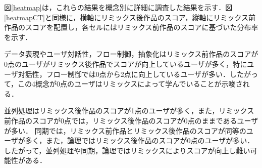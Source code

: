 \documentclass[submit,techrep,noauthor]{ipsj}
\newcommand{\memo}[1]{\colorbox{magenta!30}{\textbf{MEMO}}{\color{red!50}\textbf{[#1]}}}
\begin{document}


図\ref{heatmap}は，これらの結果を概念別に詳細に調査した結果を示す．図\ref{heatmapCT}と同様に，横軸にリミックス後作品のスコア，縦軸にリミックス前作品のスコアを配置し，各セルにはリミックス前作品のスコアに基づいた分布率を示す．

データ表現やユーザ対話性，フロー制御，抽象化はリミックス前作品のスコアが0点のユーザがリミックス後作品でスコアが向上しているユーザが多く，特にユーザ対話性，フロー制御では0点から2点に向上しているユーザが多い．したがって，この4概念が0点のユーザはリミックスによって学んでいることが示唆される．

並列処理はリミックス後作品のスコアが1点のユーザが多く，また，リミックス前作品のスコアが0点では，リミックス後作品のスコアが0点のままであるユーザが多い．
同期では，リミックス前作品とリミックス後作品のスコアが同等のユーザが多く，また，論理ではリミックス後作品のスコアが0点のユーザが多い．したがって，並列処理や同期，論理ではリミックスによりスコアが向上し難い可能性がある．





\end{document}
